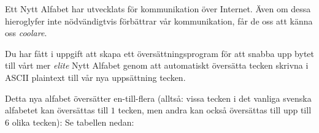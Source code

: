 

Ett Nytt Alfabet har utvecklats för kommunikation över Internet. Även om dessa hieroglyfer inte nödvändigtvis 
förbättrar vår kommunikation, får de oss att känna oss \emph{coolare}.

Du har fått i uppgift att skapa ett översättningsprogram för att snabba upp bytet till vårt mer \emph{elite}
Nytt Alfabet genom att automatiskt översätta tecken skrivna i ASCII plaintext till vår nya uppsättning tecken.

Detta nya alfabet översätter en-till-flera (alltså: vissa tecken i det vanliga
svenska alfabetet kan översättas till $1$ tecken, men andra kan också översättas till
upp till $6$ olika tecken): Se tabellen nedan:

